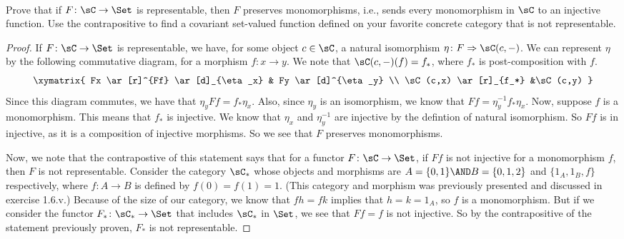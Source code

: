 \documentclass[main.tex]{subfiles}
\begin{document}
\paragraph{}
\begin{exercise}
	 Prove that if $F\colon \sC \rightarrow \Set$ is representable, then $F$
	 preserves monomorphisms, i.e., sends every monomorphism in $\sC$ to
	 an injective function. Use the contrapositive to find a covariant
	 set-valued function defined on your favorite concrete category that is not
	 representable.
\end{exercise}

\begin{proof}

If $F \colon \sC \rightarrow  \Set$ is representable, we have, for some object
$c \in \sC$, a natural isomorphism $\eta\colon F \Rightarrow \sC(c,-)$. We can
represent $\eta$ by the following commutative diagram, for a morphism $f\colon
x\rightarrow y$. We note that $\sC(c,-)(f) = f_*$, where $f_*$ is
post-composition with $f$.
$$
\xymatrix{
Fx
\ar[r]^{Ff}
\ar[d]_{\eta_x}
& Fy
\ar[d]^{\eta_y}
\\
\sC(c,x)
\ar[r]_{f_*}
&\sC(c,y)
}
$$
Since this diagram commutes, we have that $\eta_yFf = f_* \eta_x$.  Also, since
$\eta_y$ is an isomorphism, we know that $Ff = \eta_y^{-1}f_*\eta_x$. Now,
suppose $f$ is a monomorphism. This means that $f_*$ is injective. We know that
$\eta_x$ and $\eta_y^{-1}$ are injective by the defintion of natural
isomorphism. So $Ff$ is in injective, as it is a composition of injective
morphisms. So we see that $F$ preserves monomorphisms.

Now, we note that the contrapostive of this statement says that for a functor
$F\colon \sC \rightarrow \Set$, if $Ff$ is not injective for a monomorphism
$f$, then
$F$ is not representable. Consider the category $\sC_*$ whose objects and
morphisms are $ A =\{0,1\} \AND B = \{0,1,2\} $  and $\{1_A, 1_B, f\}$ respectively, where $f
 \colon A \rightarrow B$ is defined by $f(0)=f(1)= 1.$ (This category and
morphism was previously presented and discussed in exercise 1.6.v.) Because of
the size of our category, we know that $fh = fk$ implies that $h = k = 1_A$, so
$f$ is a monomorphism. But if we consider the functor $F_*\colon \sC_* \rightarrow
\Set$ that includes $\sC_*$ in $\Set$, we see that $Ff = f$ is not injective. So
by the contrapositive of the statement previously proven, $F_*$ is not
representable.
\end{proof}
\end{document}
